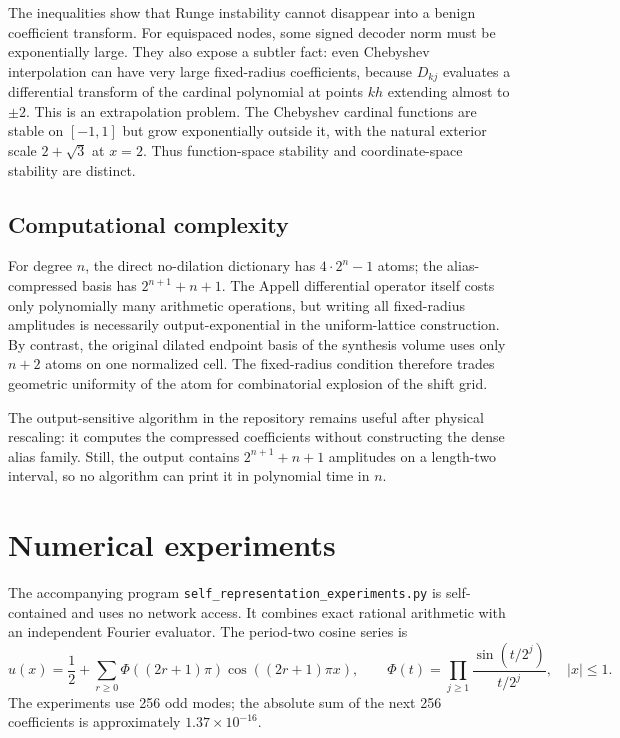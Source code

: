 \documentclass[11pt,oneside]{article}
\numberwithin{equation}{section}
\theoremstyle{definition}
\theoremstyle{remark}
\begin{document}
The inequalities show that Runge instability cannot disappear into a benign
coefficient transform.  For equispaced nodes, some signed decoder norm must
be exponentially large.  They also expose a subtler fact: even Chebyshev
interpolation can have very large fixed-radius coefficients, because
$D_{kj}$ evaluates a differential transform of the cardinal polynomial at
points $kh$ extending almost to $\pm2$.  This is an extrapolation problem.
The Chebyshev cardinal functions are stable on $[-1,1]$ but grow
exponentially outside it, with the natural exterior scale
$2+\sqrt3$ at $x=2$.  Thus function-space stability and coordinate-space
stability are distinct.

\subsection{Computational complexity}

For degree $n$, the direct no-dilation dictionary has $4\cdot2^n-1$ atoms;
the alias-compressed basis has $2^{n+1}+n+1$.  The Appell differential
operator itself costs only polynomially many arithmetic operations, but
writing all fixed-radius amplitudes is necessarily output-exponential in the
uniform-lattice construction.  By contrast, the original dilated endpoint
basis of the synthesis volume uses only $n+2$ atoms on one normalized cell.
The fixed-radius condition therefore trades geometric uniformity of the atom
for combinatorial explosion of the shift grid.

The output-sensitive algorithm in the repository remains useful after
physical rescaling: it computes the compressed coefficients without
constructing the dense alias family.  Still, the output contains
$2^{n+1}+n+1$ amplitudes on a length-two interval, so no algorithm can print
it in polynomial time in $n$.

\section{Numerical experiments}
\label{sec:numerics}

The accompanying program
\nolinkurl{self_representation_experiments.py} is self-contained and uses no
network access.  It combines exact rational arithmetic with an independent
Fourier evaluator.  The period-two cosine series is
\begin{equation}
 u(x)=\frac12+\sum_{r\ge0}
 \Phi((2r+1)\pi)\cos((2r+1)\pi x),
 \qquad
 \Phi(t)=\prod_{j\ge1}\frac{\sin(t/2^j)}{t/2^j},
 \quad |x|\le1.
 \label{eq:up-cosine}
\end{equation}
The experiments use 256 odd modes; the absolute sum of the next 256
coefficients is approximately $1.37\times10^{-16}$.
\end{document}
